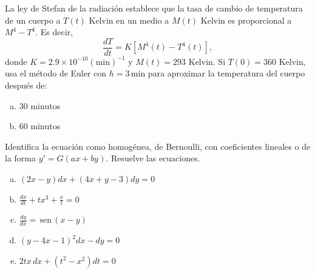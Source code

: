 \documentclass[12pt]{exam}
\renewcommand{\sin}{\,\text{sen}\,}
\begin{document}
\begin{questions}
     
     \question
     La ley de Stefan de la radiación establece que la tasa de cambio de temperatura de un cuerpo a $T(t)$ Kelvin en un medio a $M(t)$ Kelvin es proporcional a $M^4-T^4$. Es decir, $$\frac{dT}{dt}=K\left[M^4(t)-T^4(t) \right],$$ donde $K=2.9\times10^{-10}(\text{min})^{-1}$ y $M(t)=293$ Kelvin. Si $T(0)=360$ Kelvin, usa el método de Euler con $h=3\,\text{min}$ para aproximar la temperatura del cuerpo después de:
     
     \begin{enumerate}[a)]
         \item 30 minutos
         \item 60 minutos
     \end{enumerate}


  
     \question
     Identifica la ecuación como homogénea, de Bernoulli, con coeficientes lineales o de la forma $y'=G(ax+by)$. Resuelve las ecuaciones.
     \begin{enumerate}[a)]
        \item $(2x-y)dx+(4x+y-3)dy=0$
        \item $\frac{dx}{dt}+tx^3+\frac{x}{t}=0$
        \item $\frac{dy}{dx}= \sin(x-y)$
     	\item $(y-4x-1)^2dx-dy=0$
        \item $2tx\,dx+(t^2-x^2)dt=0$
       \end{enumerate}


\end{questions}
\end{document}

